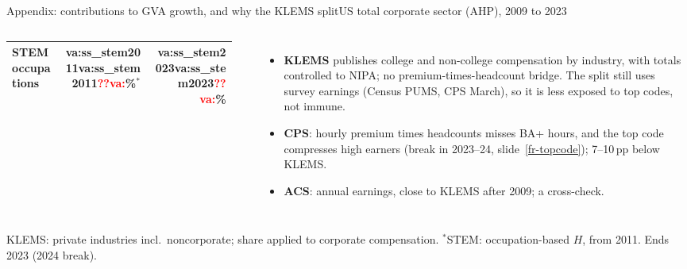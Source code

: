 \documentclass[aspectratio=169,10pt,t]{beamer}
\newcommand{\vget}[2]{\ifcsname #1:#2\endcsname\csname #1:#2\endcsname\else\textcolor{red}{\textbf{??#1:\detokenize{#2}}}\fi}
\newcommand{\va}[1]{\vget{va}{#1}}%
\newcommand{\src}[1]{\vfill{\tiny\textcolor{muted}{#1}\par}\vspace{0.04cm}}
\newcommand{\slref}[1]{slide~\ref{#1}}
\begin{document}
\begin{frame}[label=fr-contrib]{Appendix: contributions to GVA growth, and why the KLEMS split}{US total corporate sector (AHP), 2009 to 2023}
\begin{columns}[T]
{\begin{tabular}{@{}lrr@{}}
STEM occupations & \va{ss_stem2011}\%$^{*}$ & \va{ss_stem2023}\%\\\bottomrule
\end{tabular}}\\[0.15cm]
{\scriptsize
\begin{itemize}\setlength{\itemsep}{0.04cm}
\item \textbf{KLEMS} publishes college and non-college compensation by industry, with totals controlled to NIPA; no premium-times-headcount bridge. The split still uses survey earnings (Census PUMS, CPS March), so it is less exposed to top codes, not immune.
\item \textbf{CPS}: hourly premium times headcounts misses BA+ hours, and the top code compresses high earners (break in 2023--24, \slref{fr-topcode}); 7--10\,pp below KLEMS.
\item \textbf{ACS}: annual earnings, close to KLEMS after 2009; a cross-check.
\end{itemize}}
\end{columns}
\src{KLEMS: private industries incl.\ noncorporate; share applied to corporate compensation. $^{*}$STEM: occupation-based $H$, from 2011. Ends 2023 (2024 break).}
\end{frame}
\end{document}
